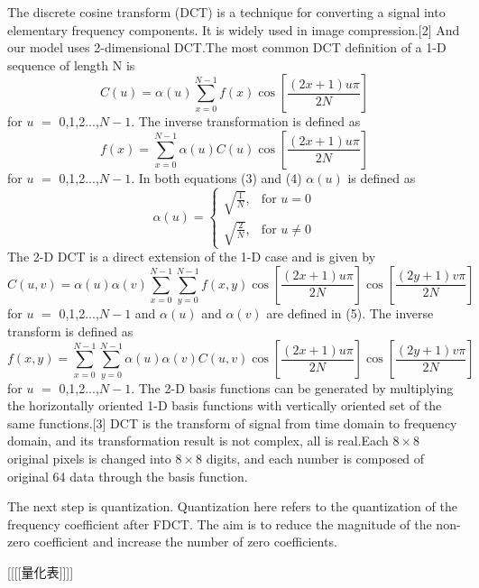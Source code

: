 \documentclass{mcmthesis}
\begin{document}
The discrete cosine transform (DCT) is a technique for converting a signal into elementary frequency components. It is widely used in image compression.[2] And our model uses 2-dimensional DCT.The most common DCT definition of a 1-D sequence of length N is 
\begin{equation}
  C(u)=\alpha(u)\sum_{x=0}^{N-1}f(x)\cos\left[\frac{(2x+1)u\pi}{2N}\right]
\end{equation}
for $u$ $=$ 0,1,2...,$N-1$. The inverse transformation is defined as
\begin{equation}
  f(x)=\sum_{x=0}^{N-1}\alpha(u)C(u)\cos\left[\frac{(2x+1)u\pi}{2N}\right]
\end{equation}
for $u$ $=$ 0,1,2...,$N-1$. In both equations (3) and (4) $\alpha(u)$ is defined as 
\begin{equation}
  \alpha(u)=\begin{cases}\sqrt{\frac1N},&\text{for }u=0\\
    \sqrt{\frac2N},&\text{for } u\not= 0
    \end{cases}
\end{equation}
The 2-D DCT is a direct extension of the 1-D case and is given by
\begin{equation}
  C(u,v) = \alpha(u)\alpha(v)\sum_{x=0}^{N-1}\sum_{y=0}^{N-1}f(x,y)\cos\left[\frac{(2x+1)u\pi}{2N}\right]\cos\left[\frac{(2y+1)v\pi}{2N}\right]
\end{equation}
for $u$ $=$ 0,1,2...,$N-1$ and $\alpha(u)$ and $\alpha(v)$ are defined in (5). The inverse transform is defined as 
\begin{equation}
  f(x,y) = \sum_{x=0}^{N-1}\sum_{y=0}^{N-1}\alpha(u)\alpha(v)C(u,v)\cos\left[\frac{(2x+1)u\pi}{2N}\right]\cos\left[\frac{(2y+1)v\pi}{2N}\right]
\end{equation}
for $u$ $=$ 0,1,2...,$N-1$. The 2-D basis functions can be generated by multiplying the horizontally oriented 1-D basis functions with vertically oriented set of the same functions.[3] DCT is the transform of signal from time domain to frequency domain, and its transformation result is not complex, all is real.Each $8\times8$ original pixels is changed into $8\times8$ digits, and each number is composed of original 64 data through the basis function.

The next step is quantization. Quantization here refers to the quantization of the frequency coefficient after FDCT. The aim is to reduce the magnitude of the non-zero coefficient and increase the number of zero coefficients.

[[[[量化表]]]]
\end{document}
